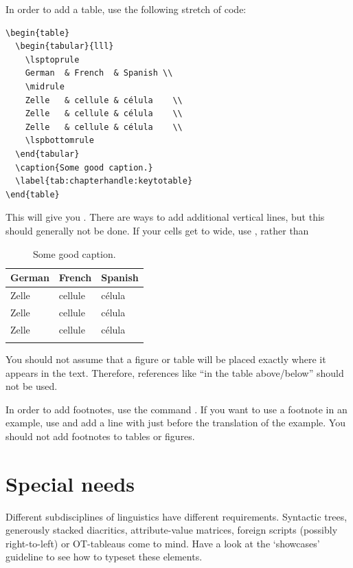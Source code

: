 In order to add a table, use the following stretch of code:

\begin{verbatim}
\begin{table} 
  \begin{tabular}{lll}
    \lsptoprule
    German  & French  & Spanish \\
    \midrule
    Zelle   & cellule & célula    \\
    Zelle   & cellule & célula    \\
    Zelle   & cellule & célula    \\
    \lspbottomrule
  \end{tabular}
  \caption{Some good caption.}
  \label{tab:chapterhandle:keytotable}
\end{table}
\end{verbatim}

This will give you  . There are ways to add additional vertical lines, but this should generally not be done. If your cells get to wide, use , rather than 
\begin{table}[h]
  \begin{tabular}{lll}
    \lsptoprule
    German  & French  & Spanish \\
    \midrule
    Zelle   & cellule & célula    \\
    Zelle   & cellule & célula    \\
    Zelle   & cellule & célula    \\
    \lspbottomrule
  \end{tabular}
  \caption{Some good caption.}
  \label{tab:chapterhandle:keytotable}
\end{table}

You should not assume that a figure or table will be placed exactly where it appears in the text. Therefore, references like ``in the table above/below'' should not be used. 

In order to add footnotes, use the command . If you want to use a footnote in an example, use  and add a line with  just before the translation of the example. You should not add footnotes to tables or figures.

\section{Special needs}
Different subdisciplines of linguistics have different requirements. Syntactic trees, generously stacked diacritics, attribute-value matrices, foreign scripts (possibly right-to-left) or OT-tableaus come to mind. Have a look at the `showcases' guideline to see how to typeset these elements.

